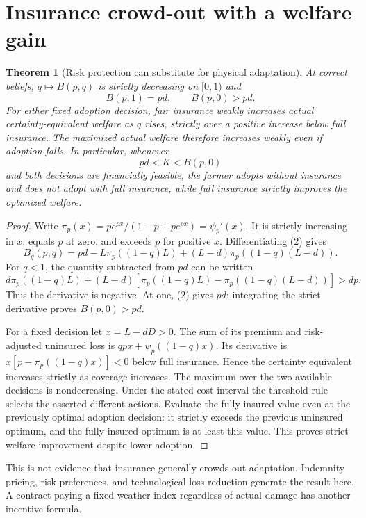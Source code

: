 \documentclass[11pt,a4paper]{article}
\newtheorem{theorem}{Theorem}[section]
\theoremstyle{remark}
\begin{document}
\section{Insurance crowd-out with a welfare gain}
\begin{theorem}[Risk protection can substitute for physical adaptation]
At correct beliefs, $q\mapsto B(p,q)$ is strictly decreasing on $[0,1)$ and
\[
 B(p,1)=pd,\qquad B(p,0)>pd.
\]
For either fixed adoption decision, fair insurance weakly increases actual certainty-equivalent welfare as $q$ rises, strictly over a positive increase below full insurance. The maximized actual welfare therefore increases weakly even if adoption falls. In particular, whenever
\[
 pd<K<B(p,0)
\]
and both decisions are financially feasible, the farmer adopts without insurance and does not adopt with full insurance, while full insurance strictly improves the optimized welfare.
\end{theorem}
\begin{proof}
Write
$\pi_p(x)=pe^{\rho x}/(1-p+pe^{\rho x})=\psi_p'(x)$.
It is strictly increasing in $x$, equals $p$ at zero, and exceeds $p$ for positive $x$. Differentiating (2) gives
\[
 B_q(p,q)=pd-L\pi_p((1-q)L)
 +(L-d)\pi_p((1-q)(L-d)).
\]
For $q<1$, the quantity subtracted from $pd$ can be written
\[
 d\pi_p((1-q)L)+(L-d)
 [\pi_p((1-q)L)-\pi_p((1-q)(L-d))]>dp.
\]
Thus the derivative is negative. At one, (2) gives $pd$; integrating the strict derivative proves $B(p,0)>pd$.

For a fixed decision let $x=L-dD>0$. The sum of its premium and risk-adjusted uninsured loss is $qpx+\psi_p((1-q)x)$. Its derivative is $x[p-\pi_p((1-q)x)]<0$ below full insurance. Hence the certainty equivalent increases strictly as coverage increases. The maximum over the two available decisions is nondecreasing. Under the stated cost interval the threshold rule selects the asserted different actions. Evaluate the fully insured value even at the previously optimal adoption decision: it strictly exceeds the previous uninsured optimum, and the fully insured optimum is at least this value. This proves strict welfare improvement despite lower adoption.
\end{proof}
This is not evidence that insurance generally crowds out adaptation. Indemnity pricing, risk preferences, and technological loss reduction generate the result here. A contract paying a fixed weather index regardless of actual damage has another incentive formula.
\end{document}
